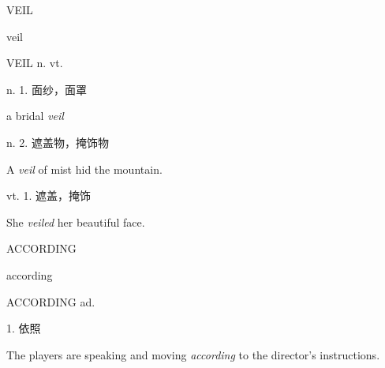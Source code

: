 \begin{flashcard}{
VEIL

veil
}
\begin{center}
VEIL n. vt. \textipa{[veil]}
\end{center}
n. 1. 面纱，面罩

a bridal \textit{veil}

n. 2. 遮盖物，掩饰物

A \textit{veil} of mist hid the mountain.

vt. 1. 遮盖，掩饰

She \textit{veiled} her beautiful face.

\end{flashcard}
\begin{flashcard}{
ACCORDING

according
}
\begin{center}
ACCORDING ad. 
\end{center}
1. 依照

The players are speaking and moving \textit{according} to the director's instructions.

\end{flashcard}
